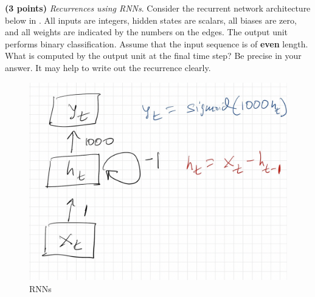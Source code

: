 \noindent {}
\textbf{(3 points)} \textit{Recurrences using RNNs}. Consider the recurrent network architecture below in . All inputs are integers, hidden states are scalars, all biases are zero, and all weights are indicated by the numbers on the edges. The output unit performs binary classification. Assume that the input sequence is of \textbf{even} length. What is computed by the output unit at the final time step? Be precise in your answer. It may help to write out the recurrence clearly.

\begin{figure}[!h]
    \centering
    \includegraphics[width=0.5\linewidth]{HWs//HW2//figures/1.png}
    \caption{RNNs}
    \label{fig:rnn}
\end{figure}

